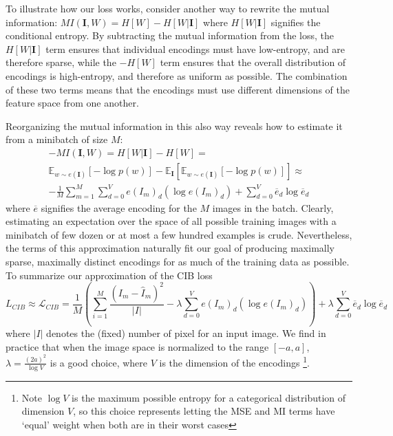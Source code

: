 To illustrate how our loss works, consider another way to rewrite the mutual information: $ MI\left(\mathbf{I}, W\right) = H[W] - H[W | \mathbf{I}] $ where $H[W | \mathbf{I}]$ signifies the conditional entropy. By subtracting the mutual information from the loss, the $H[W | \mathbf{I}]$ term ensures that individual encodings must have low-entropy, and are therefore sparse, while the $-H[W]$ term ensures that the overall distribution of encodings is high-entropy, and therefore as uniform as possible. The combination of these two terms means that the encodings must use different dimensions of the feature space from one another.

Reorganizing the mutual information in this also way reveals how to estimate it from a minibatch of size $M$:
\begin{equation}
\begin{split}
    -MI\left(\mathbf{I}, W\right) = H[W | \mathbf{I}] - H[W] = \\
    \mathbb{E}_{w \sim e(\mathbf{I})}\left[ -\log p(w) \right] - \mathbb{E}_\mathbf{I}\left[ \mathbb{E}_{w \sim e(\mathbf{I})}\left[ -\log p(w) \right] \right] \approx \\
    -\frac{1}{M} \sum_{m=1}^M \sum_{d=0}^V e(I_m)_d (\log e(I_m)_d) +
            \sum_{d=0}^V \overline{e}_d \log \overline{e}_d
    \end{split}
\end{equation}
where $\overline{e}$ signifies the average encoding for the $M$ images in the batch. Clearly, estimating an expectation over the space of all possible training images with a minibatch of few dozen or at most a few hundred examples is crude. Nevertheless, the terms of this approximation naturally fit our goal of producing maximally sparse, maximally distinct encodings for as much of the training data as possible. To summarize our approximation of the CIB loss
\begin{equation}
L_{CIB} \approx \mathcal{L}_{CIB} = \frac{1}{M} \left( \sum_{i=1}^M \frac{(I_m - \hat{I}_m)^2}{|I|}
                                    - \lambda \sum_{d=0}^V e(I_m)_d (\log e(I_m)_d) \right)+
                                     \lambda \sum_{d=0}^V \overline{e}_d \log \overline{e}_d
\end{equation}
where $|I|$ denotes the (fixed) number of pixel for an input image. We find in practice that when the image space is normalized to the range $[-a,a]$, $\lambda = \frac{(2a)^2}{\log V}$ is a good choice, where $V$ is the dimension of the encodings \footnote{Note $\log V$ is the maximum possible entropy for a categorical distribution of dimension $V$, so this choice represents letting the MSE and MI terms have `equal' weight when both are in their worst cases}.

